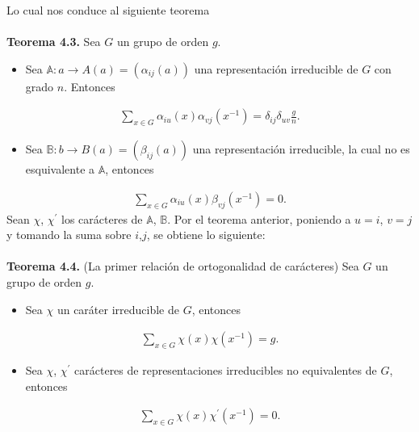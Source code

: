 \documentclass[12pt]{book}
\theoremstyle{definition}
\newcounter{in}
\begin{document}
Lo cual nos conduce al siguiente teorema\\~\\
\textbf{Teorema 4.3. } Sea $G$ un grupo de orden $g$.
\begin{itemize}
\item Sea $\mathbb{A}: a \rightarrow A(a)=(\alpha_{ij}(a))$ una representación irreducible de $G$ con grado $n$. Entonces
\end{itemize}
\begin{equation*}
\begin{aligned}
\sum_{x \in G} \alpha_{iu}(x) \alpha_{vj}(x^{-1}) = \delta_{ij} \delta_{uv}\frac{g}{n}.
\end{aligned}
\end{equation*}
\begin{itemize}
\item Sea $\mathbb{B}:b \rightarrow B(a)=(\beta_{ij}(a))$ una representación irreducible, la cual no es esquivalente a $\mathbb{A}$, entonces
\end{itemize}
\begin{equation*}
\begin{aligned}
\sum_{x \in G} \alpha_{iu}(x) \beta_{vj}(x^{-1}) = 0.
\end{aligned}
\end{equation*}
Sean $\chi$, $\chi^{'}$ los carácteres de $\mathbb{A}$, $\mathbb{B}$. Por el teorema anterior, poniendo a $u=i$, $v=j$ y tomando la suma sobre $i$,$j$, se obtiene lo siguiente:\\~\\
\textbf{Teorema 4.4. } (La primer relación de ortogonalidad de carácteres) Sea $G$ un grupo de orden $g$.
\begin{itemize}
\item Sea $\chi$ un caráter irreducible de $G$, entonces 
\end{itemize}
\begin{equation*}
\begin{aligned}
\sum_{x \in G} \chi(x) \chi(x^{-1}) = g.
\end{aligned}
\end{equation*}
\begin{itemize}
\item Sea $\chi$, $\chi^{'}$ carácteres de representaciones irreducibles no equivalentes de $G$, entonces 
\end{itemize}
\begin{equation*}
\begin{aligned}
\sum_{x \in G} \chi(x) \chi^{'}(x^{-1}) = 0.
\end{aligned}
\end{equation*}
\end{document}
